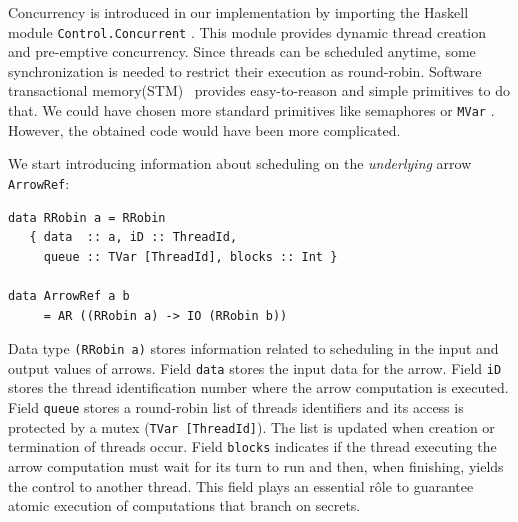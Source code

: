 \documentclass[times, 10pt,twocolumn]{article}
\begin{document}
Concurrency is introduced in our implementation by importing 
the Haskell module \texttt{Control.Concurrent} \cite{finne:1996b,ghc} . This module 
provides dynamic thread creation and pre-emptive
concurrency. 
Since threads can be scheduled 
anytime, some synchronization is needed  
to restrict their execution as round-robin.
Software transactional memory(STM)~\cite{Harris:PPOPP05} provides 
easy-to-reason and simple primitives to do that. 
We could have chosen more standard primitives 
like semaphores or \texttt{MVar} \cite{finne:1996b}. However, the obtained 
code would have been more complicated.

We start introducing information
about scheduling on the \emph{underlying} arrow \texttt{ArrowRef}:
\begin{Verbatim}[fontsize=\footnotesize]
data RRobin a = RRobin
   { data  :: a, iD :: ThreadId,
     queue :: TVar [ThreadId], blocks :: Int }

data ArrowRef a b 
     = AR ((RRobin a) -> IO (RRobin b))
\end{Verbatim}
Data type \texttt{(RRobin a)} stores
information related to scheduling in the 
input and output values of arrows. 
Field \texttt{data} stores the input data for the 
arrow. 
Field \texttt{iD} stores the thread identification number where 
the arrow computation is executed. Field \texttt{queue} stores 
a round-robin list of threads identifiers and its   
access is protected by a mutex (\texttt{TVar [ThreadId]}). 
The list is updated when creation or termination of threads 
occur. Field \texttt{blocks}
indicates if the thread executing the arrow computation 
must wait for its turn to run and then, when finishing, yields the
control to another thread. This field plays an essential r\^ole to
guarantee atomic execution of computations that branch on secrets. 
\end{document}
